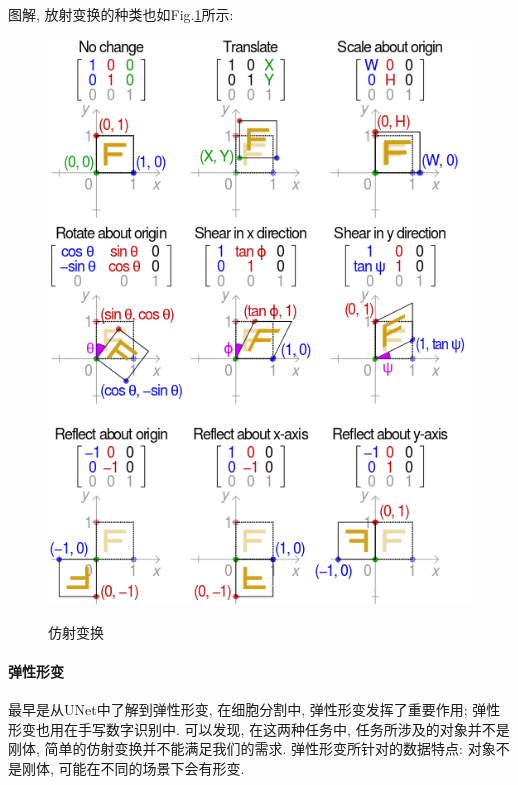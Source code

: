 图解, 放射变换的种类也如Fig.\ref{fig:affine}所示: 
\begin{figure}[h]
	\centering
	\includegraphics[width=.8\textwidth]{pics/affine.png}
	\label{fig:affine}
	\caption{仿射变换}
\end{figure}

\paragraph{弹性形变\cite{simard2003best}}
最早是从UNet中了解到弹性形变, 在细胞分割中, 弹性形变发挥了重要作用; 弹性形变也用在手写数字识别中. 可以发现, 在这两种任务中, 任务所涉及的对象并不是刚体, 简单的仿射变换并不能满足我们的需求. 弹性形变所针对的数据特点: 对象不是刚体, 可能在不同的场景下会有形变. 


